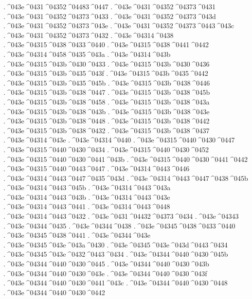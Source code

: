 {.^^^^043e^^^^0431^^^^04352^^^^04483^^^^0447
.^^^^043e^^^^0431^^^^04352^^^^04373^^^^0431
.^^^^043e^^^^0431^^^^04352^^^^04373^^^^0433
.^^^^043e^^^^0431^^^^04352^^^^04373^^^^043d
.^^^^043e^^^^0431^^^^04352^^^^04373^^^^043e
.^^^^043e^^^^0431^^^^04352^^^^04373^^^^0443^^^^043c
.^^^^043e^^^^0431^^^^04352^^^^04373^^^^0432
.^^^^043e^^^^04314^^^^0438
.^^^^043e^^^^04315^^^^0438^^^^0433^^^^0440
.^^^^043e^^^^04315^^^^0438^^^^0441^^^^0442
.^^^^043e^^^^04314^^^^0458^^^^0435^^^^043a
.^^^^043e^^^^04314^^^^043b
.^^^^043e^^^^04315^^^^043b^^^^0430^^^^0433
.^^^^043e^^^^04315^^^^043b^^^^0430^^^^0436
.^^^^043e^^^^04315^^^^043b^^^^0435^^^^043f
.^^^^043e^^^^04315^^^^043b^^^^0435^^^^0442
.^^^^043e^^^^04315^^^^043b^^^^0435^^^^045b
.^^^^043e^^^^04315^^^^043b^^^^0438^^^^0446
.^^^^043e^^^^04315^^^^043b^^^^0438^^^^0447
.^^^^043e^^^^04315^^^^043b^^^^0438^^^^045b
.^^^^043e^^^^04315^^^^043b^^^^0438^^^^0458
.^^^^043e^^^^04315^^^^043b^^^^0438^^^^043a
.^^^^043e^^^^04315^^^^043b^^^^0438^^^^043b
.^^^^043e^^^^04315^^^^043b^^^^0438^^^^043e
.^^^^043e^^^^04315^^^^043b^^^^0438^^^^0448
.^^^^043e^^^^04315^^^^043b^^^^0438^^^^0442
.^^^^043e^^^^04315^^^^043b^^^^0438^^^^0432
.^^^^043e^^^^04315^^^^043b^^^^0438^^^^0437
.^^^^043e^^^^04314^^^^043e
.^^^^043e^^^^04314^^^^0440
.^^^^043e^^^^04315^^^^0440^^^^0430^^^^0447
.^^^^043e^^^^04315^^^^0440^^^^0430^^^^0434
.^^^^043e^^^^04315^^^^0440^^^^0430^^^^0452
.^^^^043e^^^^04315^^^^0440^^^^0430^^^^0441^^^^043b
.^^^^043e^^^^04315^^^^0440^^^^0430^^^^0441^^^^0442
.^^^^043e^^^^04315^^^^0440^^^^0443^^^^0447
.^^^^043e^^^^04314^^^^0443^^^^0446
.^^^^043e^^^^04314^^^^0443^^^^0447^^^^0435^^^^043d
.^^^^043e^^^^04314^^^^0443^^^^0447^^^^0438^^^^045b
.^^^^043e^^^^04314^^^^0443^^^^045b
.^^^^043e^^^^04314^^^^0443^^^^043a
.^^^^043e^^^^04314^^^^0443^^^^043b
.^^^^043e^^^^04314^^^^0443^^^^043e
.^^^^043e^^^^04314^^^^0443^^^^0441
.^^^^043e^^^^04314^^^^0443^^^^0448
.^^^^043e^^^^04314^^^^0443^^^^0432
.^^^^043e^^^^0431^^^^04432^^^^04373^^^^0434
.^^^^043e^^^^04343
.^^^^043e^^^^04344^^^^0435
.^^^^043e^^^^04344^^^^0438
.^^^^043e^^^^04345^^^^0438^^^^0433^^^^0440
.^^^^043e^^^^04345^^^^0438^^^^0441
.^^^^043e^^^^04344^^^^043e
.^^^^043e^^^^04345^^^^043e^^^^043a^^^^0430
.^^^^043e^^^^04345^^^^043e^^^^043d^^^^0443^^^^0434
.^^^^043e^^^^04345^^^^043e^^^^0432^^^^0443^^^^0434
.^^^^043e^^^^04344^^^^0440^^^^0430^^^^045b
.^^^^043e^^^^04344^^^^0440^^^^0430^^^^0445
.^^^^043e^^^^04344^^^^0440^^^^0430^^^^043b
.^^^^043e^^^^04344^^^^0440^^^^0430^^^^043e
.^^^^043e^^^^04344^^^^0440^^^^0430^^^^043f
.^^^^043e^^^^04344^^^^0440^^^^0430^^^^0441^^^^043c
.^^^^043e^^^^04344^^^^0440^^^^0430^^^^0448
.^^^^043e^^^^04344^^^^0440^^^^0430^^^^0442
}
